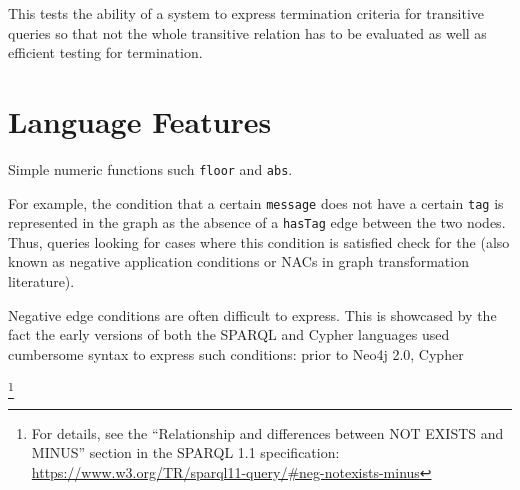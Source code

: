 


This tests the ability of a system to express termination criteria for transitive queries so that not the whole transitive relation has to be evaluated as well as efficient testing for termination.




\section{Language Features}











Simple numeric functions such \texttt{floor} and \texttt{abs}.
















For example, the condition that a certain \texttt{message} does not have a certain \texttt{tag} is represented in the graph as the absence of a \texttt{hasTag} edge between the two nodes. Thus, queries looking for cases where this condition is satisfied check for the (also known as negative application conditions or NACs in graph transformation literature).

Negative edge conditions are often difficult to express. This is showcased by the fact the early versions of both the SPARQL and Cypher languages used cumbersome syntax to express such conditions: prior to Neo4j 2.0, Cypher 


\footnote{For details, see the ``Relationship and differences between NOT EXISTS and MINUS'' section in the SPARQL 1.1 specification: \url{https://www.w3.org/TR/sparql11-query/\#neg-notexists-minus}}



